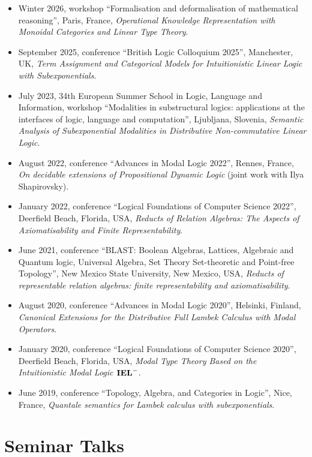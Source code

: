 \documentclass[10pt,a4paper]{article}
\begin{document}
\begin{itemize}[leftmargin=*]
    \item Winter 2026, workshop ``Formalisation and deformalisation of mathematical reasoning'', Paris, France, \emph{Operational Knowledge Representation with Monoidal Categories and Linear Type Theory}.
    \item September 2025, conference ``British Logic Colloquium 2025'', Manchester, UK, \textit{Term Assignment and Categorical Models for Intuitionistic Linear Logic with Subexponentials}.
    \item July 2023, 34th European Summer School in Logic, Language and Information, workshop ``Modalities in substructural logics: applications at the interfaces of logic, language and computation'', Ljubljana, Slovenia, \textit{Semantic Analysis of Subexponential Modalities in Distributive Non-commutative Linear Logic}.
    \item August 2022, conference ``Advances in Modal Logic 2022'', Rennes, France, \textit{On decidable extensions of Propositional Dynamic Logic} (joint work with Ilya Shapirovsky).
    \item January 2022, conference ``Logical Foundations of Computer Science 2022'', Deerfield Beach, Florida, USA, \textit{Reducts of Relation Algebras: The Aspects of Axiomatisability and Finite Representability}.
    \item June 2021, conference ``BLAST: Boolean Algebras, Lattices, Algebraic and Quantum logic, Universal Algebra, Set Theory Set-theoretic and Point-free Topology'', New Mexico State University, New Mexico, USA, \textit{Reducts of representable relation algebras: finite representability and axiomatisability}.
    \item August 2020, conference ``Advances in Modal Logic 2020'', Helsinki, Finland, \textit{Canonical Extensions for the Distributive Full Lambek Calculus with Modal Operators}.
    \item January 2020, conference ``Logical Foundations of Computer Science 2020'', Deerfield Beach, Florida, USA, \textit{Modal Type Theory Based on the Intuitionistic Modal Logic ${\bf IEL}^{-}$}.
    \item June 2019, conference ``Topology, Algebra, and Categories in Logic'', Nice, France, \textit{Quantale semantics for Lambek calculus with subexponentials}.
\end{itemize}

\section{Seminar Talks}
\end{document}
